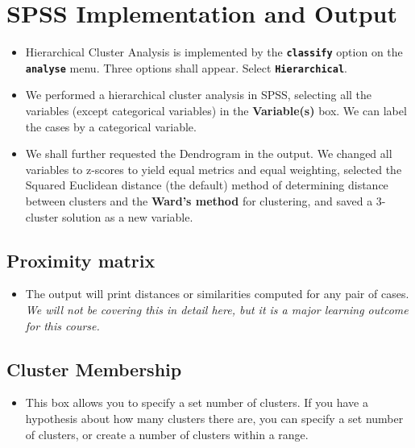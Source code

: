 	
	

\section{SPSS Implementation and Output}
\begin{itemize}
	\item Hierarchical Cluster Analysis is implemented by the \textbf{\texttt{classify}} option on the \textbf{\texttt{analyse}} menu.
	Three options shall appear. Select \textbf{\texttt{Hierarchical}}.
	
\item We performed a hierarchical cluster analysis in SPSS, selecting all the variables (except categorical variables) in the \textbf{Variable(s)} box. We can label the cases by a categorical variable. 
	
\item We shall further requested the Dendrogram in the output. We changed all
	variables to z-scores to yield equal metrics and equal weighting, selected the Squared Euclidean distance
	(the default) method of determining distance between clusters and the \textbf{Ward's method} for
	clustering, and saved a 3-cluster solution as a new variable.
\end{itemize}

\subsection{Proximity matrix}
\begin{itemize}
	\item The output will print distances or similarities computed for any pair of cases. \textit{We will not be covering this in detail here, but it is a major learning outcome for this course.}
\end{itemize}

\subsection{Cluster Membership}
\begin{itemize}
	\item This box allows you to specify a set number of clusters. If you have a
	hypothesis about how many clusters there are, you can specify a set number of clusters, or
	create a number of clusters within a range.
\end{itemize}

